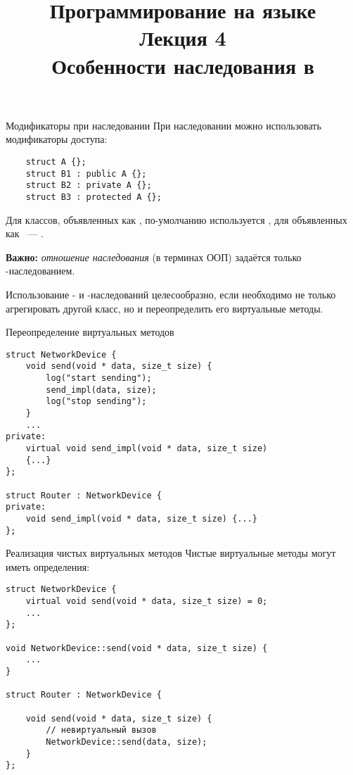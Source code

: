\documentclass{beamer}
\title{{\bf Программирование на языке \langcpp\protect\\Лекция
4\protect\vspace{1em}\\}Особенности наследования в \langcpp}
\begin{document}
\begin{frame} 
  \titlepage
\end{frame}

\begin{frame}[fragile]{Модификаторы при наследовании}
    При наследовании можно использовать модификаторы доступа:
\begin{lstlisting}
    struct A {};
    struct B1 : public A {};
    struct B2 : private A {};
    struct B3 : protected A {};
\end{lstlisting}
Для классов, объявленных как , по-умолчанию используется
, для объявленных как ~— .
\vspace{3mm}

{\bf Важно:} {\em отношение наследования} (в терминах ООП) задаётся только -наследованием.
\vspace{3mm}

Использование - и -наследований целесообразно,
если необходимо не только агрегировать другой класс, но и переопределить его виртуальные методы.
\end{frame}

\begin{frame}[fragile]{Переопределение  виртуальных методов}
    \begin{lstlisting}[basicstyle=\fontsize{9pt}{1em}\ttfamily,commentstyle=\fontsize{9pt}{1em}\ttfamily\color{MOOCGreen}]
struct NetworkDevice {
    void send(void * data, size_t size) {
        log("start sending");
        send_impl(data, size);
        log("stop sending");
    }
    ...
private:
    virtual void send_impl(void * data, size_t size) 
    {...}
};

struct Router : NetworkDevice {
private:
    void send_impl(void * data, size_t size) {...}
};
    \end{lstlisting}
\end{frame}

\begin{frame}[fragile]{Реализация чистых виртуальных методов}
    Чистые виртуальные методы могут иметь определения:
    \begin{lstlisting}[basicstyle=\fontsize{9pt}{1em}\ttfamily,commentstyle=\fontsize{9pt}{1em}\ttfamily\color{MOOCGreen}]
struct NetworkDevice {
    virtual void send(void * data, size_t size) = 0;
    ...
};

void NetworkDevice::send(void * data, size_t size) {
    ...
}

struct Router : NetworkDevice {

    void send(void * data, size_t size) {
        // невиртуальный вызов
        NetworkDevice::send(data, size);
    }
};
    \end{lstlisting}
\end{frame}
\end{document}

